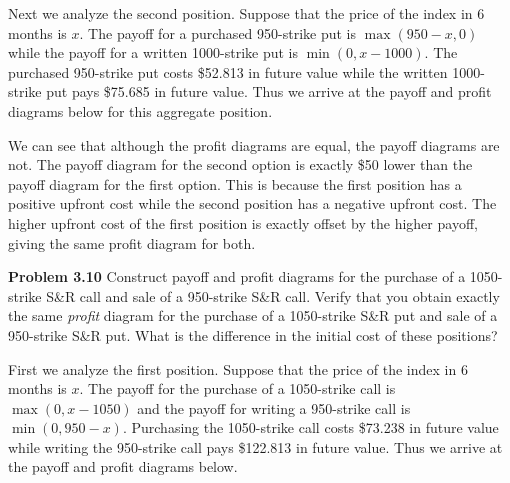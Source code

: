 \documentclass[12pt]{article}
\newcommand{\problem}[1]{\bigskip \noindent \textbf{Problem #1}}
\theoremstyle{plain}
\begin{document}
Next we analyze the second position. Suppose that the price of the index in 6 months is $x$. The payoff for a purchased 950-strike put is $\max(950-x,0)$ while the payoff for a written 1000-strike put is $\min(0,x-1000)$. The purchased 950-strike put costs \$52.813 in future value while the written 1000-strike put pays \$75.685 in future value. Thus we arrive at the payoff and profit diagrams below for this aggregate position.

\begin{center}
\end{center}

We can see that although the profit diagrams are equal, the payoff diagrams are not. The payoff diagram for the second option is exactly \$50 lower than the payoff diagram for the first option. This is because the first position has a positive upfront cost while the second position has a negative upfront cost. The higher upfront cost of the first position is exactly offset by the higher payoff, giving the same profit diagram for both.

\problem{3.10} Construct payoff and profit diagrams for the purchase of a 1050-strike S\&R call and sale of a 950-strike S\&R call. Verify that you obtain exactly the same \emph{profit} diagram for the purchase of a 1050-strike S\&R put and sale of a 950-strike S\&R put. What is the difference in the initial cost of these positions?

First we analyze the first position. Suppose that the price of the index in 6 months is $x$. The payoff for the purchase of a 1050-strike call is $\max(0,x-1050)$ and the payoff for writing a 950-strike call is $\min(0,950-x)$. Purchasing the 1050-strike call costs \$73.238 in future value while writing the 950-strike call pays \$122.813 in future value. Thus we arrive at the payoff and profit diagrams below.
\end{document}
